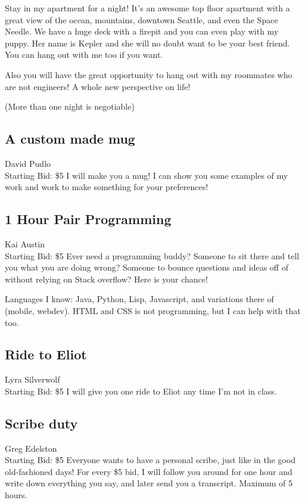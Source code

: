 \documentclass[11pt]{article}
\begin{document}
Stay in my apartment for a night! It's an awesome top floor apartment with a great view of the ocean, mountains, downtown Seattle, and even the Space Needle.  We have a huge deck with a firepit and you can even play with my puppy.  Her name is Kepler and she will no doubt want to be your best friend.  You can hang out with me too if you want.

Also you will have the great opportunity to hang out with my roommates who are not engineers!  A whole new perspective on life!

(More than one night is negotiable)
\subsection{A custom made mug}
David Pudlo
\\
Starting Bid: \$5
\newline
I will make you a mug! I can show you some examples of my work and work to make something for your preferences!
\subsection{1 Hour Pair Programming}
Kai Austin
\\
Starting Bid: \$5
\newline
Ever need a programming buddy? Someone to sit there and tell you what you are doing wrong? Someone to bounce questions and ideas off of without relying on Stack overflow? Here is your chance!

Languages I know: Java, Python, Lisp, Javascript, and variations there of (mobile, webdev). HTML and CSS is not programming, but I can help with that too.
\subsection{Ride to Eliot}
Lyra Silverwolf
\\
Starting Bid: \$5
\newline
I will give you one ride to Eliot any time I'm not in class.
\subsection{Scribe duty}
Greg Edelston
\\
Starting Bid: \$5
\newline
Everyone wants to have a personal scribe, just like in the good old-fashioned days! For every \$5 bid, I will follow you around for one hour and write down everything you say, and later send you a transcript. Maximum of 5 hours.
\end{document}
